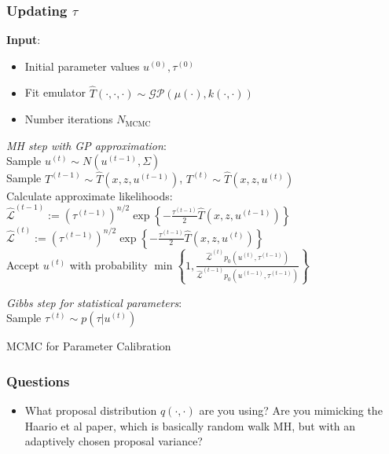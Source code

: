\documentclass[12pt]{article}
\begin{document}
\subsubsection{Updating $\tau$}



\bigskip

 \begin{algorithm}[H]
	\SetAlgoLined
	
	\textbf{Input}: 
	\begin{itemize}
	\item Initial parameter values $u^{(0)}, \tau^{(0)}$
	\item Fit emulator $\hat{T}(\cdot, \cdot, \cdot) \sim \mathcal{GP}(\mu(\cdot), k(\cdot, \cdot))$
	\item Number iterations $N_{\text{MCMC}}$
	\end{itemize}
		
	\bigskip
	
	 {
	\textit{MH step with GP approximation}: \\[.2cm]
	Sample $u^{(t)} \sim N(u^{(t - 1)}, \Sigma)$ \\
	Sample $T^{(t - 1)} \sim \hat{T}(x, z, u^{(t - 1)})$, $T^{(t)} \sim \hat{T}(x, z, u^{(t)})$ \\
	Calculate approximate likelihoods: \\
	 $\hat{\mathcal{L}}^{(t - 1)} := \left(\tau^{(t - 1)}\right)^{n/2} \exp\left\{-\frac{\tau^{(t - 1)}}{2} \hat{T}(x, z, u^{(t - 1)}) \right\}$ \\ 
	 $\hat{\mathcal{L}}^{(t)} := \left(\tau^{(t - 1)}\right)^{n/2} \exp\left\{-\frac{\tau^{(t - 1)}}{2} \hat{T}(x, z, u^{(t)}) \right\}$  \\
	Accept $u^{(t)}$ with probability $\min\left\{1, \frac{\hat{\mathcal{L}}^{(t)}p_0(u^{(t)}, \tau^{(t - 1)})}{\hat{\mathcal{L}}^{(t - 1)} p_0(u^{(t - 1)}, \tau^{(t - 1)})}\right\}$
	
	\bigskip
	
	\textit{Gibbs step for statistical parameters}: \\[.2cm]
	Sample $\tau^{(t)} \sim p(\tau|u^{(t)})$
	
	}

	
\caption{MCMC for Parameter Calibration}
\end{algorithm}


\subsubsection{Questions}
\begin{itemize}
\item What proposal distribution $q(\cdot, \cdot)$ are you using? Are you mimicking the Haario et al paper, which is basically random walk MH, but with an adaptively chosen proposal variance?
\end{itemize}
\end{document}
